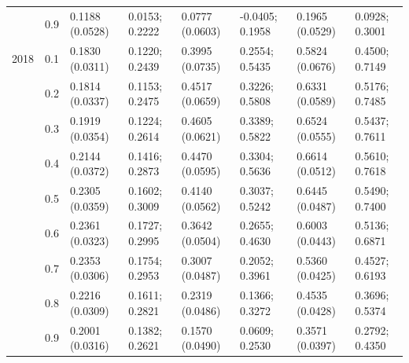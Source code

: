 \begin{table}
{\begin{tabular}[t]{llllllll}
 & 0.9 & 0.1188 (0.0528) & 0.0153; 0.2222 & 0.0777 (0.0603) & -0.0405; 0.1958 & 0.1965 (0.0529) & 0.0928; 0.3001\\
2018 & 0.1 & 0.1830 (0.0311) & 0.1220; 0.2439 & 0.3995 (0.0735) & 0.2554; 0.5435 & 0.5824 (0.0676) & 0.4500; 0.7149\\
 & 0.2 & 0.1814 (0.0337) & 0.1153; 0.2475 & 0.4517 (0.0659) & 0.3226; 0.5808 & 0.6331 (0.0589) & 0.5176; 0.7485\\
 & 0.3 & 0.1919 (0.0354) & 0.1224; 0.2614 & 0.4605 (0.0621) & 0.3389; 0.5822 & 0.6524 (0.0555) & 0.5437; 0.7611\\
 & 0.4 & 0.2144 (0.0372) & 0.1416; 0.2873 & 0.4470 (0.0595) & 0.3304; 0.5636 & 0.6614 (0.0512) & 0.5610; 0.7618\\
 & 0.5 & 0.2305 (0.0359) & 0.1602; 0.3009 & 0.4140 (0.0562) & 0.3037; 0.5242 & 0.6445 (0.0487) & 0.5490; 0.7400\\
 & 0.6 & 0.2361 (0.0323) & 0.1727; 0.2995 & 0.3642 (0.0504) & 0.2655; 0.4630 & 0.6003 (0.0443) & 0.5136; 0.6871\\
 & 0.7 & 0.2353 (0.0306) & 0.1754; 0.2953 & 0.3007 (0.0487) & 0.2052; 0.3961 & 0.5360 (0.0425) & 0.4527; 0.6193\\
 & 0.8 & 0.2216 (0.0309) & 0.1611; 0.2821 & 0.2319 (0.0486) & 0.1366; 0.3272 & 0.4535 (0.0428) & 0.3696; 0.5374\\
 & 0.9 & 0.2001 (0.0316) & 0.1382; 0.2621 & 0.1570 (0.0490) & 0.0609; 0.2530 & 0.3571 (0.0397) & 0.2792; 0.4350\\
\bottomrule
\end{tabular}}
\end{table}
